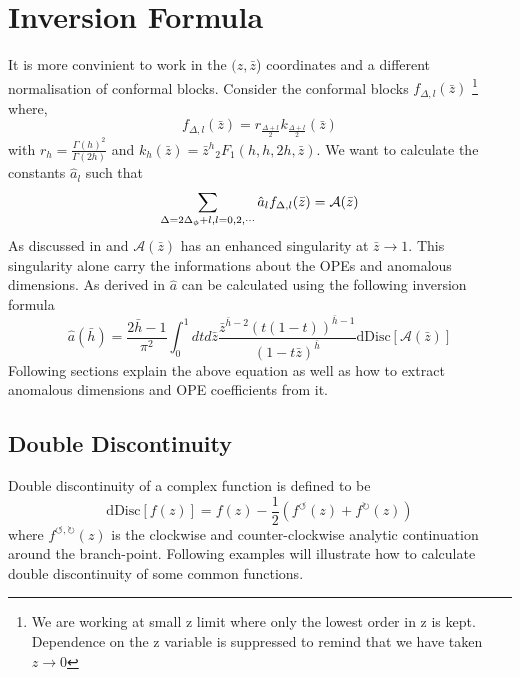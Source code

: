 \documentclass[12pt,a4paper,oneside]{book}
\theoremstyle{definition}
\begin{document}
   \section{Inversion Formula}
        It is more convinient to work in the $(z,\bar{z}$) coordinates and a different normalisation of conformal blocks. Consider the conformal blocks $f_{\Delta,l}(\bar{z})$ \footnote{We are working at small z limit where only the lowest order in z is kept. Dependence on the z variable is suppressed to remind that we have taken $z\to0$} where,
        \begin{equation}
            f_{\Delta,l}(\bar{z}) = r_{\frac{\Delta+l}{2}}k_{\frac{\Delta+l}{2}}(\bar{z})
        \end{equation} 
        with $r_h = \frac{\Gamma(h)^2}{\Gamma(2h)}$ and $k_h(\bar{z}) = \bar{z}^h{}_2F_1(h,h,2h,\bar{z})$. We want to calculate the constants $\hat{a}_l$ such that
        \begin{equation}
            \sum_{\Delta = 2\Delta_{\phi}+l,\\l=0,2,\cdots} \hat{a}_lf_{\Delta,l}(\bar{z}) = \mathcal{A}(\bar{z})
        \end{equation}
        As discussed in \cite{inversiongravitation} and \cite{taming} $\mathcal{A}(\bar{z})$ has an enhanced singularity at $\bar{z}\to1$. This singularity alone carry the informations about the OPEs and anomalous dimensions. As derived in \cite{inversiongravitation} $\hat{a}$ can be calculated using the following inversion formula
        \begin{equation}
            \hat{a}(\bar{h}) = \frac{2\bar{h}-1}{\pi^2}\int_0^1dtd\bar{z}\frac{\bar{z}^{\bar{h}-2}(t(1-t))^{\bar{h}-1}}{(1-t\bar{z})^{\bar{h}}}\text{dDisc}[\mathcal{A}(\bar{z})]
        \end{equation}
        Following sections explain the above equation as well as how to extract anomalous dimensions and OPE coefficients  from it.
    \subsection{Double Discontinuity}
        Double discontinuity of a complex function is defined to be
        \begin{equation}
            \text{dDisc}[f(z)] = f(z) - \frac{1}{2}\left(f^{\circlearrowleft}(z) + f^{\circlearrowright}(z) \right)
        \end{equation}
        where $f^{\circlearrowleft,\circlearrowright}(z)$ is the clockwise and counter-clockwise analytic continuation around the branch-point. Following examples will illustrate how to calculate double discontinuity of some common functions.
\end{document}
